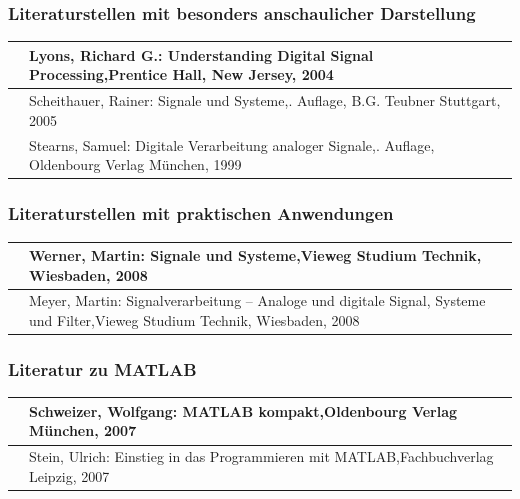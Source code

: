 \subsubsection{Literaturstellen mit besonders anschaulicher Darstellung}

\begin{tabular}{|p{0.6in}|p{5.7in}|} \hline 
[Lyon04] & Lyons, Richard G.: Understanding Digital Signal Processing,\newline Prentice Hall, New Jersey, 2004 \\ \hline 
[Schei05] & Scheithauer, Rainer: Signale und Systeme,\newline 2. Auflage, B.G. Teubner Stuttgart, 2005 \\ \hline 
[Stea99] & Stearns, Samuel: Digitale Verarbeitung analoger Signale,\newline 7. Auflage, Oldenbourg Verlag M\"{u}nchen, 1999 \\ \hline 
\end{tabular}

\subsubsection{Literaturstellen mit praktischen Anwendungen}

\begin{tabular}{|p{0.6in}|p{5.7in}|} \hline 
[Wern08] & Werner, Martin: Signale und Systeme,\newline Vieweg Studium Technik, Wiesbaden, 2008 \\ \hline 
[Meye08] & Meyer, Martin: Signalverarbeitung -- Analoge und digitale Signal, Systeme und Filter,\newline Vieweg Studium Technik, Wiesbaden, 2008 \\ \hline 
\end{tabular}

\subsubsection{Literatur zu MATLAB}

\begin{tabular}{|p{0.6in}|p{5.7in}|} \hline 
[Schw07] & Schweizer, Wolfgang: MATLAB kompakt,\newline Oldenbourg Verlag M\"{u}nchen, 2007 \\ \hline 
[Stei07] & Stein, Ulrich: Einstieg in das Programmieren mit MATLAB,\newline Fachbuchverlag Leipzig, 2007 \\ \hline 
\end{tabular}

